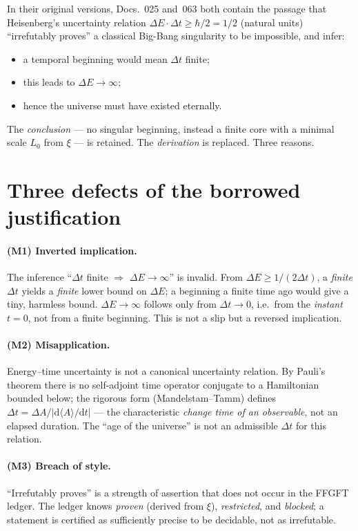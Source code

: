 In their original versions, Docs.~025 and~063 both contain the passage that Heisenberg's uncertainty relation
$\Delta E\cdot\Delta t \ge \hbar/2 = 1/2$ (natural units) \enquote{irrefutably proves} a classical
Big-Bang singularity to be impossible, and infer:
\begin{itemize}
\item a temporal beginning would mean $\Delta t$ finite;
\item this leads to $\Delta E \to \infty$;
\item hence the universe must have existed eternally.
\end{itemize}
The \emph{conclusion} --- no singular beginning, instead a finite core with a minimal scale $L_0$
from $\xi$ --- is retained. The \emph{derivation} is replaced. Three reasons.

\section{Three defects of the borrowed justification}

\paragraph{(M1) Inverted implication.} The inference \enquote{$\Delta t$ finite $\Rightarrow$
$\Delta E \to \infty$} is invalid. From $\Delta E \ge 1/(2\Delta t)$, a \emph{finite} $\Delta t$
yields a \emph{finite} lower bound on $\Delta E$; a beginning a finite time ago would give a tiny,
harmless bound. $\Delta E \to \infty$ follows only from $\Delta t \to 0$, i.e.\ from the
\emph{instant} $t=0$, not from a finite beginning. This is not a slip but a reversed implication.

\paragraph{(M2) Misapplication.} Energy--time uncertainty is not a canonical uncertainty relation.
By Pauli's theorem there is no self-adjoint time operator conjugate to a Hamiltonian bounded
below; the rigorous form (Mandelstam--Tamm) defines
$\Delta t = \Delta A / |\mathrm{d}\langle A\rangle/\mathrm{d}t|$ --- the characteristic
\emph{change time of an observable}, not an elapsed duration. The \enquote{age of the universe} is
not an admissible $\Delta t$ for this relation.

\paragraph{(M3) Breach of style.} \enquote{Irrefutably proves} is a strength of assertion that does
not occur in the FFGFT ledger. The ledger knows \emph{proven} (derived from $\xi$),
\emph{restricted}, and \emph{blocked}; a statement is certified as sufficiently precise to be
decidable, not as irrefutable.

